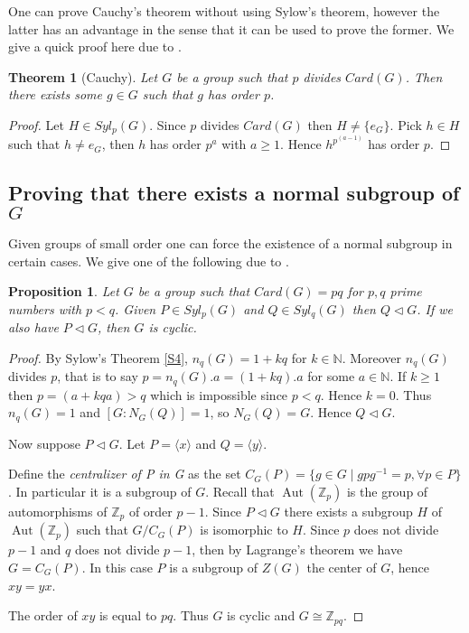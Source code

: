 \documentclass{article}
\theoremstyle{definition}
\theoremstyle{plain}
\newtheorem{proposition}[subsubsection]{Proposition}
\theoremstyle{plain}
\theoremstyle{plain}
\theoremstyle{plain}
\theoremstyle{definition}
\theoremstyle{plain}
\newtheorem{thmeng}[subsubsection]{Theorem}
\theoremstyle{plain}
\DeclareMathOperator{\Aut}{Aut} %
\begin{document}
One can prove Cauchy's theorem without using Sylow's theorem, however the latter has an advantage in the sense that it can be used to prove the former. We give a quick proof here due to \cite[p. ~12]{serre1979ens}.

\begin{thmeng}[Cauchy]
	Let \( G \) be a group such that \( p \) divides \( Card(G) \). Then there exists some \( g \in G \) such that \( g \) has order \( p \).
\end{thmeng}

\begin{proof}
	Let \( H \in Syl_p(G) \). Since \( p \) divides \( Card(G) \) then \( H \neq \{e_G\} \). Pick \( h \in H \) such that \( h \neq e_G \), then \( h \) has order \( p^{a} \) with \( a \geq 1 \). Hence \( h^{p^{(a-1)}} \) has order \( p \).
\end{proof}

\subsection{Proving that there exists a normal subgroup of \ensuremath{G}}

Given groups of small order one can force the existence of a normal subgroup in certain cases. We give one of the following due to \cite[p. ~143]{dummit2003abstract}.

\begin{proposition}\label{primes}
	Let \( G \) be a group such that \( Card(G) = pq \) for \( p,q \) prime numbers with \( p < q \). Given \( P \in Syl_p(G) \) and \( Q \in Syl_q(G) \) then \( Q \triangleleft G \). If we also have \( P \triangleleft G \), then \( G \) is cyclic.
\end{proposition}

\begin{proof}
	By Sylow's Theorem \ref{S4}, \( n_q(G) = 1 + kq \) for \( k \in \mathbb{N} \). Moreover \( n_q(G) \) divides \( p \), that is to say \( p = n_q(G).a = (1 + kq). a \) for some \( a \in \mathbb{N} \). 
	If \( k \geq 1 \) then \( p = (a + kqa) > q \) which is impossible since \( p < q \).
	Hence \( k = 0 \).
	Thus \( n_q(G) = 1 \) and \( [G : N_G(Q)] = 1 \), so \( N_G(Q) = G \).
	Hence \( Q \triangleleft G \). 

	Now suppose \( P \triangleleft G \). Let \( P = \langle x \rangle \) and \( Q = \langle y \rangle \).

	Define the \textit{centralizer of P in G} as the set \( C_G(P) = \{ g \in G \mid gpg^{-1} = p, \forall p \in P\} \). In particular it is a subgroup of \( G \). Recall that \( \Aut({\mathbb{Z}_{p}}) \) is the group of automorphisms of \( \mathbb{Z}_{p} \) of order \( p-1 \).
	Since \( P \triangleleft G \) there exists a subgroup \( H \) of \( \Aut({\mathbb{Z}_{p}}) \) such that \( G/C_G(P) \) is isomorphic to \( H \). Since \( p \) does not divide \( p-1 \) and \( q \) does not divide \( p-1 \), then by Lagrange's theorem we have \( G = C_G(P) \). In this case \( P \) is a subgroup of \( Z(G)\) the center of \( G \), hence \( xy = yx \). 

	The order of \( xy \) is equal to \( pq \). Thus \( G \) is cyclic and \( G \cong \mathbb{Z}_{pq} \).
\end{proof}
\end{document}
